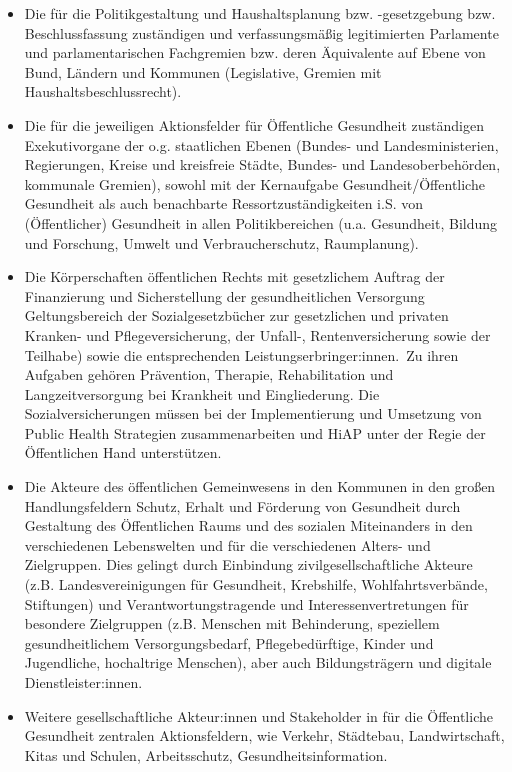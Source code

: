 \documentclass{article}
\begin{document}
\begin{itemize}
\item Die für die Politikgestaltung und Haushaltsplanung bzw. -gesetzgebung bzw. Beschlussfassung zuständigen und verfassungsmäßig legitimierten Parlamente und parlamentarischen Fachgremien bzw. deren Äquivalente auf Ebene von Bund, Ländern und Kommunen (Legislative, Gremien mit Haushaltsbeschlussrecht).


\item Die für die jeweiligen Aktionsfelder für Öffentliche Gesundheit zuständigen Exekutivorgane der o.g. staatlichen Ebenen (Bundes- und Landesministerien, Regierungen, Kreise und kreisfreie Städte, Bundes- und Landesoberbehörden, kommunale Gremien), sowohl mit der Kernaufgabe Gesundheit/Öffentliche Gesundheit als auch benachbarte Ressortzuständigkeiten i.S. von (Öffentlicher) Gesundheit in allen Politikbereichen (u.a. Gesundheit, Bildung und Forschung, Umwelt und Verbraucherschutz, Raumplanung).


\item Die Körperschaften öffentlichen Rechts mit gesetzlichem Auftrag der Finanzierung und Sicherstellung der gesundheitlichen Versorgung Geltungsbereich der Sozialgesetzbücher zur gesetzlichen und privaten Kranken- und Pflegeversicherung, der Unfall-, Rentenversicherung sowie der Teilhabe) sowie die entsprechenden Leistungserbringer:innen. Zu ihren Aufgaben gehören Prävention, Therapie, Rehabilitation und Langzeitversorgung bei Krankheit und Eingliederung. Die Sozialversicherungen müssen bei der Implementierung und Umsetzung von Public Health Strategien zusammenarbeiten und HiAP unter der Regie der Öffentlichen Hand unterstützen.


\item Die Akteure des öffentlichen Gemeinwesens in den Kommunen in den großen Handlungsfeldern Schutz, Erhalt und Förderung von Gesundheit durch Gestaltung des Öffentlichen Raums und des sozialen Miteinanders in den verschiedenen Lebenswelten und für die verschiedenen Alters- und Zielgruppen. Dies gelingt durch Einbindung zivilgesellschaftliche Akteure (z.B. Landesvereinigungen für Gesundheit, Krebshilfe, Wohlfahrtsverbände, Stiftungen) und Verantwortungstragende und Interessenvertretungen für besondere Zielgruppen (z.B. Menschen mit Behinderung, speziellem gesundheitlichem Versorgungsbedarf, Pflegebedürftige, Kinder und Jugendliche, hochaltrige Menschen), aber auch Bildungsträgern und digitale Dienstleister:innen. 


\item Weitere gesellschaftliche Akteur:innen und Stakeholder in für die Öffentliche Gesundheit zentralen Aktionsfeldern, wie Verkehr, Städtebau, Landwirtschaft, Kitas und Schulen, Arbeitsschutz, Gesundheitsinformation.


\end{itemize}
\end{document}
